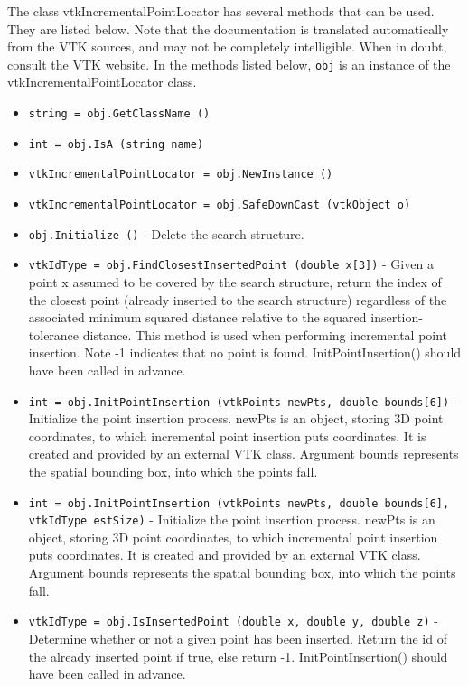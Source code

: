 The class vtkIncrementalPointLocator has several methods that can be used.
  They are listed below.
Note that the documentation is translated automatically from the VTK sources,
and may not be completely intelligible.  When in doubt, consult the VTK website.
In the methods listed below, \verb|obj| is an instance of the vtkIncrementalPointLocator class.
\begin{itemize}
\item  \verb|string = obj.GetClassName ()|

\item  \verb|int = obj.IsA (string name)|

\item  \verb|vtkIncrementalPointLocator = obj.NewInstance ()|

\item  \verb|vtkIncrementalPointLocator = obj.SafeDownCast (vtkObject o)|

\item  \verb|obj.Initialize ()| -  Delete the search structure.

\item  \verb|vtkIdType = obj.FindClosestInsertedPoint (double x[3])| -  Given a point x assumed to be covered by the search structure, return the
 index of the closest point (already inserted to the search structure) 
 regardless of the associated minimum squared distance relative to the 
 squared insertion-tolerance distance. This method is used when performing
 incremental point insertion. Note -1 indicates that no point is found. 
 InitPointInsertion() should have been called in advance.

\item  \verb|int = obj.InitPointInsertion (vtkPoints newPts, double bounds[6])| -  Initialize the point insertion process. newPts is an object, storing 3D
 point coordinates, to which incremental point insertion puts coordinates.
 It is created and provided by an external VTK class. Argument bounds
 represents the spatial bounding box, into which the points fall.

\item  \verb|int = obj.InitPointInsertion (vtkPoints newPts, double bounds[6], vtkIdType estSize)| -  Initialize the point insertion process. newPts is an object, storing 3D
 point coordinates, to which incremental point insertion puts coordinates.
 It is created and provided by an external VTK class. Argument bounds
 represents the spatial bounding box, into which the points fall.

\item  \verb|vtkIdType = obj.IsInsertedPoint (double x, double y, double z)| -  Determine whether or not a given point has been inserted. Return the id of 
 the already inserted point if true, else return -1. InitPointInsertion()
 should have been called in advance.


\end{itemize}
